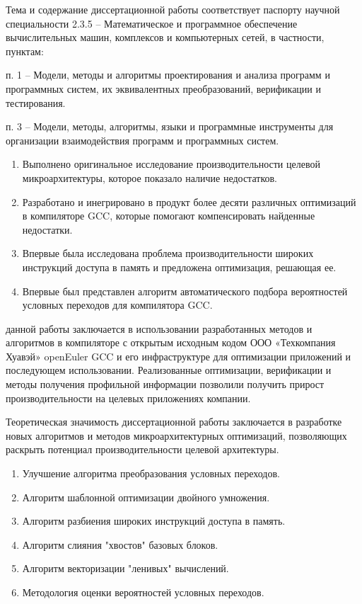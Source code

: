 Тема и содержание диссертационной работы соответствует паспорту научной
специальности 2.3.5 – Математическое и программное обеспечение вычислительных машин, комплексов и компьютерных сетей, в частности, пунктам:

п. 1 – Модели, методы и алгоритмы проектирования и анализа программ
и программных систем, их эквивалентных преобразований, верификации и тестирования.

п. 3 – Модели, методы, алгоритмы, языки и программные инструменты
для организации взаимодействия программ и программных систем.

{\novelty}
\begin{enumerate}[beginpenalty=10000] %
  \item Выполнено оригинальное исследование производительности целевой микроархитектуры, которое показало наличие недостатков.
  \item Разработано и инегрировано в продукт более десяти различных оптимизаций в компиляторе GCC, которые помогают компенсировать найденные недостатки.
  \item Впервые была исследована проблема производительности широких инструкций доступа в память и предложена оптимизация, решающая ее. 
  \item Впервые был представлен алгоритм автоматического подбора вероятностей условных переходов для компилятора GCC.
\end{enumerate}

{\influence}  данной работы заключается в использовании
разработанных методов и алгоритмов в  компиляторе с открытым исходным кодом  ООО «Техкомпания Хуавэй»  openEuler GCC и его
инфраструктуре для оптимизации приложений и последующем использовании. Реализованные оптимизации, верификации
и методы получения профильной информации позволили получить прирост производительности
на целевых приложениях компании.

Теоретическая значимость диссертационной работы заключается в разработке
новых алгоритмов и методов микроархитектурных оптимизаций, позволяющих раскрыть потенциал производительности целевой архитектуры.


{}
\begin{enumerate}[beginpenalty=10000] %
  \item Улучшение алгоритма преобразования условных переходов.
  \item Алгоритм шаблонной оптимизации двойного умножения.
  \item Алгоритм разбиения широких инструкций доступа в память.
  \item Алгоритм слияния "хвостов"\phantom{ } базовых блоков.
  \item Алгоритм векторизации "ленивых"\phantom{ } вычислений.
  \item Методология оценки вероятностей условных переходов.
\end{enumerate}

